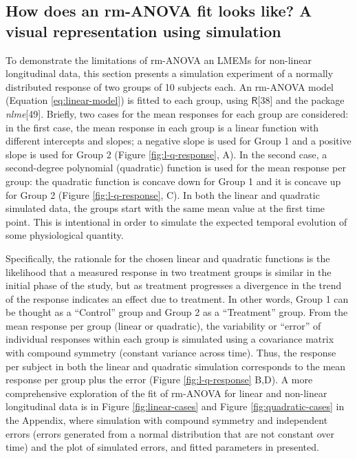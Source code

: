 \documentclass[
]{article}
\begin{document}
\hypertarget{simulation}{%
\subsection{How does an rm-ANOVA fit looks like? A visual representation using simulation}\label{simulation}}

To demonstrate the limitations of rm-ANOVA an LMEMs for non-linear longitudinal data, this section presents a simulation experiment of a normally distributed response of two groups of 10 subjects each. An rm-ANOVA model (Equation \eqref{eq:linear-model}) is fitted to each group, using \(\textsf{R}\){[}38{]} and the package \emph{nlme}{[}49{]}.
Briefly, two cases for the mean responses for each group are considered: in the first case, the mean response in each group is a linear function with different intercepts and slopes; a negative slope is used for Group 1 and a positive slope is used for Group 2 (Figure \ref{fig:l-q-response}, A). In the second case, a second-degree polynomial (quadratic) function is used for the mean response per group: the quadratic function is concave down for Group 1 and it is concave up for Group 2 (Figure \ref{fig:l-q-response}, C). In both the linear and quadratic simulated data, the groups start with the same mean value at the first time point. This is intentional in order to simulate the expected temporal evolution of some physiological quantity.

Specifically, the rationale for the chosen linear and quadratic functions is the likelihood that a measured response in two treatment groups is similar in the initial phase of the study, but as treatment progresses a divergence in the trend of the response indicates an effect due to treatment. In other words, Group 1 can be thought as a ``Control'' group and Group 2 as a ``Treatment'' group. From the mean response per group (linear or quadratic), the variability or ``error'' of individual responses within each group is simulated using a covariance matrix with compound symmetry (constant variance across time). Thus, the response per subject in both the linear and quadratic simulation corresponds to the mean response per group plus the error (Figure \ref{fig:l-q-response} B,D). A more comprehensive exploration of the fit of rm-ANOVA for linear and non-linear longitudinal data is in Figure \ref{fig:linear-cases} and Figure \ref{fig:quadratic-cases} in the Appendix, where simulation with compound symmetry and independent errors (errors generated from a normal distribution that are not constant over time) and the plot of simulated errors, and fitted parameters in presented.
\end{document}
